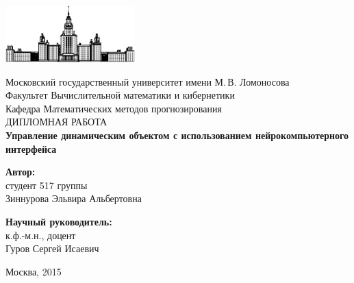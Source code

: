 \documentclass[12pt,a4paper,oneside,fleqn,leqno]{article}
\begin{document}
\begin{titlepage}
\begin{center}
    \includegraphics[width=50mm]{msu.eps}

    \bigskip
	Московский государственный университет имени М.\,В. Ломоносова\\
	Факультет Вычислительной математики и кибернетики\\
	Кафедра Математических методов прогнозирования\\[20mm]

    {\large
        ДИПЛОМНАЯ РАБОТА\\[10mm]
\bfseries
        Управление динамическим объектом с использованием нейрокомпьютерного интерфейса
    }\\[10mm]

    \vfill

\begin{flushright}
  \textbf{Автор:}\\
  студент 517 группы\\
  Зиннурова Эльвира Альбертовна

  \vspace{5mm}

  \textbf{Научный руководитель:}\\
  к.ф.-м.н., доцент\\
  Гуров Сергей Исаевич
\end{flushright}

\vfill

\begin{center}
Москва, 2015
\end{center}

\end{center}
\end{titlepage}

\newpage
\renewcommand{\contentsname}{Содержание}
\tableofcontents
\end{document}
